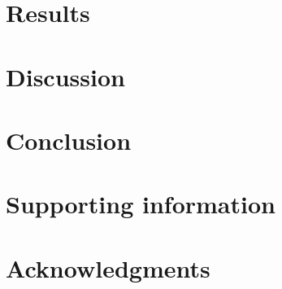 \documentclass[10pt,letterpaper]{article}
\begin{document}


\section*{Results}





\section*{Discussion}


\section*{Conclusion}



\section*{Supporting information}


\section*{Acknowledgments}


\nolinenumbers

%
%
% 
\begin{thebibliography}{10}


\end{thebibliography}
\end{document}
